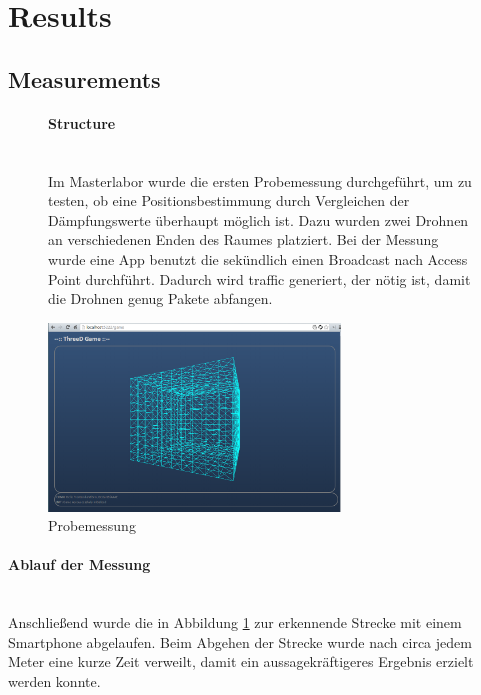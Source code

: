 \documentclass[a4paper]{spie}  %
\begin{document}
\section{Results}\label{result}
\subsection{Measurements}


\begin{figure}[H]
\begin{minipage}[t]{0.4\textwidth}
\vspace{0pt}
\paragraph{Structure}\mbox{}\\
Im Masterlabor wurde die ersten Probemessung durchgeführt, um zu testen, ob eine Positionsbestimmung durch Vergleichen der Dämpfungswerte überhaupt möglich ist. Dazu wurden zwei Drohnen an verschiedenen Enden des Raumes platziert. Bei der Messung wurde eine App benutzt die sekündlich einen Broadcast nach Access Point durchführt. Dadurch wird traffic generiert, der nötig ist, damit die Drohnen genug Pakete abfangen.
\end{minipage}
\hfill
\begin{minipage}[t]{0.5\textwidth}
\vspace{0pt}
\centering
		\includegraphics[height=5cm]{./images/FrontendInit.png}
		\caption{Probemessung}
		\label{fig:probeMessung}
\end{minipage}
\end{figure}

\paragraph{Ablauf der Messung}\mbox{}\\
Anschließend wurde die in Abbildung \ref{fig:probeMessung} zur erkennende Strecke mit einem Smartphone abgelaufen. Beim Abgehen der Strecke wurde nach circa jedem Meter eine kurze Zeit verweilt, damit ein aussagekräftigeres Ergebnis erzielt werden konnte.
\end{document}

